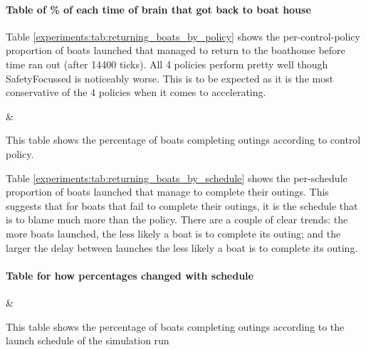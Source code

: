   \paragraph{Table of \% of each time of brain that got back to boat house}
  Table \ref{experiments:tab:returning_boats_by_policy} shows the per-control-policy proportion of boats launched that managed to return to the boathouse before time ran out (after 14400 ticks). All 4 policies perform pretty well though SafetyFocussed is noticeably worse. This is to be expected as it is the most conservative of the 4 policies when it comes to accelerating.
  \begin{table}[h]
  \centering
  {\cp & \landed}
  \caption{This table shows the percentage of boats completing outings according to control policy.}
  \label{experiments:tab:returning_boats_by_policy}
  \end{table}
  
  Table \ref{experiments:tab:returning_boats_by_schedule} shows the per-schedule proportion of boats launched that manage to complete their outings. This suggests that for boats that fail to complete their outings, it is the schedule that is to blame much more than the policy. There are a couple of clear trends: the more boats launched, the less likely a boat is to complete its outing; and the larger the delay between launches the less likely a boat is to complete its outing.
  \paragraph{Table for how percentages changed with schedule}
  \begin{table}[h]
  \centering
  {\name & \landed}
  \caption{This table shows the percentage of boats completing outings according to the launch schedule of the simulation run}
  \label{experiments:tab:returning_boats_by_schedule}
  \end{table}
  
